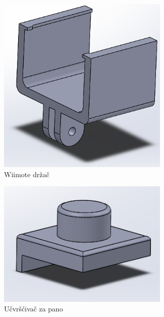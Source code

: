 \documentclass[times, utf8, diplomski]{fer}
\begin{document}
\begin{figure}[h]
\begin{subfigure}[b]{.3\textwidth}
\centering
	\includegraphics[width=0.9\textwidth]{wii}
	\caption{Wiimote držač}
	\label{fig:drzac}
\end{subfigure}
\begin{subfigure}[b]{.3\textwidth}
	\centering
	\includegraphics[width=0.9\textwidth]{platno}
	\caption{Učvršćivač za pano}
	\label{fig:ucvrscivac}
\end{subfigure}
\begin{subfigure}[b]{.3\textwidth}
	\centering

\end{subfigure}
\end{figure}
\end{document}
